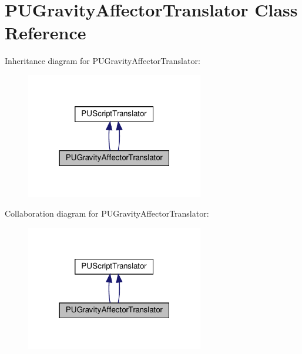 \hypertarget{classPUGravityAffectorTranslator}{}\section{P\+U\+Gravity\+Affector\+Translator Class Reference}
\label{classPUGravityAffectorTranslator}


Inheritance diagram for P\+U\+Gravity\+Affector\+Translator\+:
\nopagebreak
\begin{figure}[H]
\begin{center}
\leavevmode
\includegraphics[width=220pt]{classPUGravityAffectorTranslator__inherit__graph}
\end{center}
\end{figure}


Collaboration diagram for P\+U\+Gravity\+Affector\+Translator\+:
\nopagebreak
\begin{figure}[H]
\begin{center}
\leavevmode
\includegraphics[width=220pt]{classPUGravityAffectorTranslator__coll__graph}
\end{center}
\end{figure}
